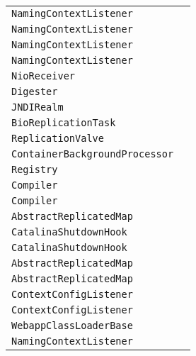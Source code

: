 \begin{center}
\begin{tabular}{ll}
\lstinline/NamingContextListener/&\raisebox{0pt}{\lstinline/ removeResourceLink(String)/}\\ 
\lstinline/NamingContextListener/&\raisebox{0pt}{\lstinline/ removeResourceLink(String)/}\\ 
\lstinline/NamingContextListener/&\raisebox{0pt}{\lstinline/ removeResourceLink(String)/}\\ 
\lstinline/NamingContextListener/&\raisebox{0pt}{\lstinline/ removeResourceLink(String)/}\\ 
\lstinline/NioReceiver/&\raisebox{0pt}{\lstinline/ run()/}\\ 
\lstinline/Digester/&\raisebox{0pt}{\lstinline/ createSAXException(String,Exception)/}\\ 
\lstinline/JNDIRealm/&\raisebox{0pt}{\lstinline/ startInternal())/}\\ 
\lstinline/BioReplicationTask/&\raisebox{0pt}{\lstinline/ sendAck(byte[])/}\\ 
\lstinline/ReplicationValve/&\raisebox{0pt}{\lstinline/ updateStats(long)/}\\ 
\lstinline/ContainerBackgroundProcessor/&\raisebox{0pt}{\lstinline/ processChildren(Container)/}\\ 
\lstinline/Registry/&\raisebox{0pt}{\lstinline/ loadDescriptors(String)/}\\ 
\lstinline/Compiler/&\raisebox{0pt}{\lstinline/ removeGeneratedClassFiles()/}\\ 
\lstinline/Compiler/&\raisebox{0pt}{\lstinline/ removeGeneratedClassFiles()/}\\ 
\lstinline/AbstractReplicatedMap/&\raisebox{0pt}{\lstinline/ Vput()/}\\ 
\lstinline/CatalinaShutdownHook/&\raisebox{0pt}{\lstinline/ run()/}\\ 
\lstinline/CatalinaShutdownHook/&\raisebox{0pt}{\lstinline/ run()/}\\ 
\lstinline/AbstractReplicatedMap/&\raisebox{0pt}{\lstinline/ Vput()/}\\ 
\lstinline/AbstractReplicatedMap/&\raisebox{0pt}{\lstinline/ Vput()/}\\ 
\lstinline/ContextConfigListener/&\raisebox{0pt}{\lstinline/ processAnnotationsFile(File)/}\\ 
\lstinline/ContextConfigListener/&\raisebox{0pt}{\lstinline/ processAnnotationsFile(File)/}\\ 
\lstinline/WebappClassLoaderBase/&\raisebox{0pt}{\lstinline/ findClassInternal(String)/}\\ 
\lstinline/NamingContextListener/&\raisebox{0pt}{\lstinline/ removeResourceLink(String)/}\\ 

\end{tabular}
\end{center}
